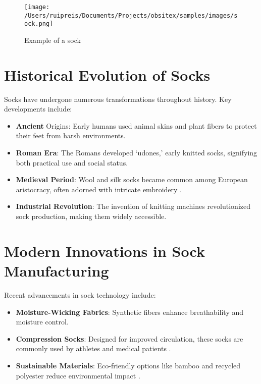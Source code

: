 \documentclass[runningheads]{llncs}
\begin{document}
\begin{figure}
\centering
\texttt{[image: /Users/ruipreis/Documents/Projects/obsitex/samples/images/sock.png]}
\caption{Example of a sock}
\label{fig:sock}
\end{figure}


\section{Historical Evolution of Socks}\label{sec:Historical_Evolution_of_Socks}



Socks have undergone numerous transformations throughout history. Key developments include:



\begin{itemize}
	\item \textbf{Ancient} Origins: Early humans used animal skins and plant fibers to protect their feet from harsh environments.
	\item \textbf{Roman Era}: The Romans developed ‘udones,’ early knitted socks, signifying both practical use and social status.
	\item \textbf{Medieval Period}: Wool and silk socks became common among European aristocracy, often adorned with intricate embroidery \citep{acharBackPainChildren2020}.
	\item \textbf{Industrial Revolution}: The invention of knitting machines revolutionized sock production, making them widely accessible.
\end{itemize}




\section{Modern Innovations in Sock Manufacturing}\label{sec:Modern_Innovations_in_Sock_Manufacturing}



Recent advancements in sock technology include:



\begin{itemize}
	\item \textbf{Moisture-Wicking Fabrics}: Synthetic fibers enhance breathability and moisture control.
	\item \textbf{Compression Socks}: Designed for improved circulation, these socks are commonly used by athletes and medical patients \citep{weiFinetunedLanguageModels2022,aghajanyanIntrinsicDimensionalityExplains2020}.
	\item \textbf{Sustainable Materials}: Eco-friendly options like bamboo and recycled polyester reduce environmental impact \citep{acharBackPainChildren2020}.
\end{itemize}
\end{document}
